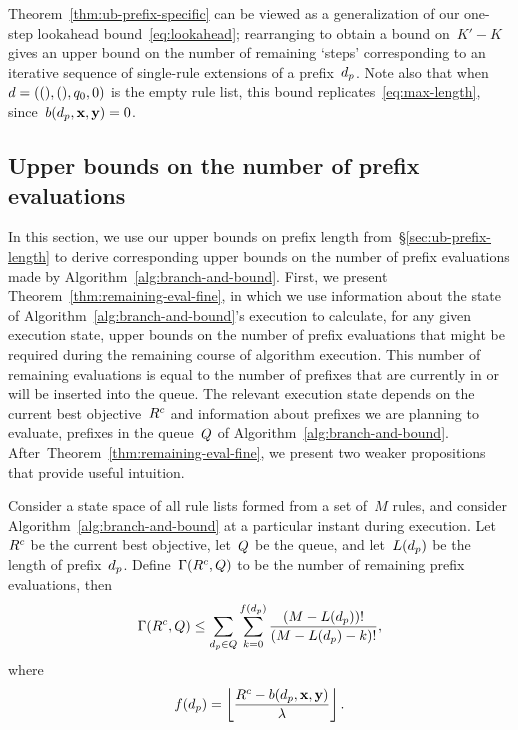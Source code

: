 Theorem~\ref{thm:ub-prefix-specific} can be viewed as a generalization
of our one-step lookahead bound~\eqref{eq:lookahead};
rearranging to obtain a bound on~${K' - K}$
gives an upper bound on the number of remaining `steps' corresponding
to an iterative sequence of single-rule extensions of a prefix~$d_p$.
%
Note also that when~${{d} = ((), (), q_0, 0)}$ is the empty rule list,
this bound replicates~\eqref{eq:max-length}, since~${b(d_p, \mathbf{x}, \mathbf{y}) = 0}$.

\subsection{Upper bounds on the number of prefix evaluations}
\label{sec:ub-size}

In this section, we use our upper bounds on prefix length
from~\S\ref{sec:ub-prefix-length} to derive corresponding
upper bounds on the number of prefix evaluations made by
Algorithm~\ref{alg:branch-and-bound}.
%
First, we present Theorem~\ref{thm:remaining-eval-fine},
in which we use information about the state of
Algorithm~\ref{alg:branch-and-bound}'s execution
to calculate, for any given execution state,
upper bounds on the number of prefix evaluations that might
be required during the remaining course of algorithm execution.
%
This number of remaining evaluations is equal to the number of
prefixes that are currently in or will be inserted into the queue.
%
The relevant execution state depends on the current
best objective~${R^c}$ and information about
prefixes we are planning to evaluate, \ie prefixes in the
queue~$Q$ of Algorithm~\ref{alg:branch-and-bound}.
%
After~Theorem~\ref{thm:remaining-eval-fine}, we present two
weaker propositions that provide useful intuition.

\begin{theorem}
\label{thm:remaining-eval-fine}
Consider a state space of all rule lists formed from a set of~$M$ rules,
and consider Algorithm~\ref{alg:branch-and-bound} at a particular instant
during execution.
%
Let~${R^c}$ be the current best objective, let~$Q$ be the queue,
and let~$L(d_p)$ be the length of prefix~$d_p$.
%
Define~${\Gamma({R^c}, Q)}$ to be the number of remaining
prefix evaluations, then
\begin{align}
\Remaining(\CurrentObj, \Queue)
\le \sum_{\Prefix \in Q} \sum_{k=0}^{f(\Prefix)} \frac{(M - L(\Prefix))!}{(M - L(\Prefix) - k)!},
\end{align}
where
\begin{align}
f(\Prefix) = \left\lfloor \frac{\CurrentObj - b(\Prefix, \x, \y)}{\Reg} \right\rfloor.
\label{eq:f}
\end{align}
\end{theorem}


